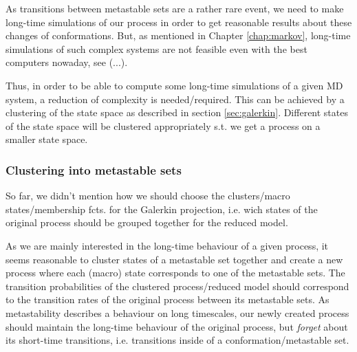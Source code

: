 


As transitions between metastable sets are a rather rare event, we need to make long-time simulations of our process in order to get reasonable results about these changes of conformations.
But, as mentioned in Chapter \ref{chap:markov}, long-time simulations of such complex systems are not feasible even with the best computers nowaday, see (...).

Thus, in order to be able to compute some long-time simulations of a given MD system, a reduction of complexity  is needed/required. This can be achieved by a clustering of the state space as described in section \ref{sec:galerkin}. Different states of the state space will be clustered appropriately s.t. we get a process on a smaller state space.

\subsubsection*{Clustering into metastable sets}

So far, we didn't mention how we should choose the clusters/macro states/membership fcts. for the Galerkin projection, i.e. wich states of the original process should be grouped together for the reduced model. %

As we are mainly interested in the long-time behaviour of a given process, it seems reasonable to cluster states of a metastable set together and create a new process where each (macro) state corresponds to one of the metastable sets. The transition probabilities of the clustered process/reduced model should correspond to the transition rates of the original process between its metastable sets. 
As metastability describes a behaviour on long timescales, our newly created process should maintain the long-time behaviour of the original process, but \textit{forget} about its short-time transitions, i.e. transitions inside of a conformation/metastable set.

